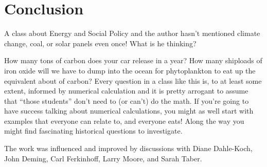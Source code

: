 \documentclass[man]{apa7}
\begin{document}
\section{Conclusion}
A class about Energy and Social Policy and the author hasn't mentioned climate change, coal, or solar panels even once!  What is he thinking?  

How many tons of carbon does your car release in a year? How many shiploads of iron oxide will we have to dump into the ocean for phytoplankton to eat up the equivalent about of carbon?  Every question in a class like this is, to at least some extent, informed by numerical calculation and it is pretty arrogant to assume that ``those students'' don't need to (or can't) do the math.  If you're going to have success talking about numerical calculations, you might as well start with examples that everyone can relate to, and everyone eats!  Along the way you might find fascinating historical questions to investigate.   


The work was influenced and improved by discussions with 
Diane Dahle-Koch, 
John Deming, 
Carl Ferkinhoff, 
Larry Moore, 
and Sarah Taber.
\end{document}
